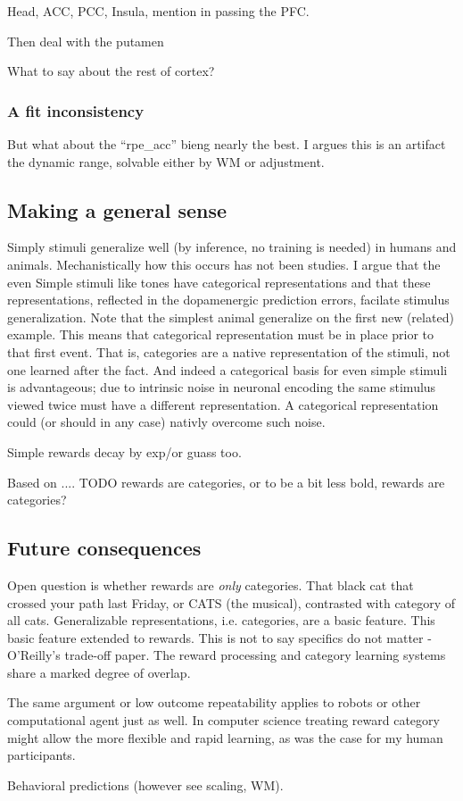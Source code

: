 \documentclass[doc,12pt]{apa}        %
\begin{document}
Head, ACC, PCC, Insula, mention in passing the PFC.  

Then deal with the putamen

What to say about the rest of cortex?

\subsubsection{A fit inconsistency}
\label{subsub:inconsistency}
But what about the ``rpe\_acc'' bieng nearly the best.  I argues this is an artifact the dynamic range, solvable either by WM or adjustment.


\subsection{Making a general sense}
\label{sub:generalsense}
Simply stimuli generalize well (by inference, no training is needed) in humans and animals.  Mechanistically how this occurs has not been studies.  I argue that the even Simple stimuli like tones have categorical representations and that these representations, reflected in the dopamenergic prediction errors, facilate stimulus generalization.  Note that the simplest animal generalize on the first new (related) example.  This means that categorical representation must be in place prior to that first event.  That is, categories are a native representation of the stimuli, not one learned after the fact.  And indeed a categorical basis for even simple stimuli is advantageous; due to intrinsic noise in neuronal encoding the same stimulus viewed twice must have a different representation.  A categorical representation could (or should in any case) nativly overcome such noise. 

Simple rewards decay by exp/or guass too.  



Based on .... TODO rewards are categories, or to be a bit less bold, rewards are categories? 

\subsection{Future consequences}
\label{sub:future}
Open question is whether rewards are \emph{only} categories.  That black cat that crossed your path last Friday, or CATS (the musical), contrasted with category of all cats.  Generalizable representations, i.e. categories, are a basic feature.  This basic feature extended to rewards.  This is not to say specifics do not matter - O'Reilly's trade-off paper. The reward processing and category learning systems share a marked degree of overlap.

The same argument or low outcome repeatability applies to robots or other computational agent just as well. In computer science treating reward category might allow the more flexible and rapid learning, as was the case for my human participants.  

Behavioral predictions (however see scaling, WM).

\clearpage
\newpage

\end{document}
